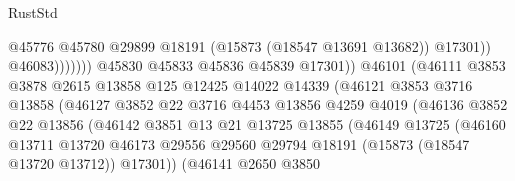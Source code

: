 \begin{lexlean}{RustStd}
\begin{coremodule}
                                                  @45776
                                                  @45780
                                                  @29899
                                                  @18191
                                                  (@15873 (@18547 @13691 @13682))
                                                  @17301))
                                              @46083)))))))
                                @45830
                                @45833
                                @45836
                                @45839
                                @17301))
                            @46101
                            (@46111
                              @3853
                              @3878
                              @2615
                              @13858
                              @125
                              @12425
                              @14022
                              @14339
                              (@46121
                                @3853
                                @3716
                                @13858
                                (@46127
                                  @3852
                                  @22
                                  @3716
                                  @4453
                                  @13856
                                  @4259
                                  @4019
                                  (@46136
                                    @3852
                                    @22
                                    @13856
                                    (@46142
                                      @3851
                                      @13
                                      @21
                                      @13725
                                      @13855
                                      (@46149
                                        @13725
                                        (@46160
                                          @13711
                                          @13720
                                          @46173
                                          @29556
                                          @29560
                                          @29794
                                          @18191
                                          (@15873 (@18547 @13720 @13712))
                                          @17301))
                                      (@46141
                                        @2650
                                        @3850

\end{coremodule}
\end{lexlean}
